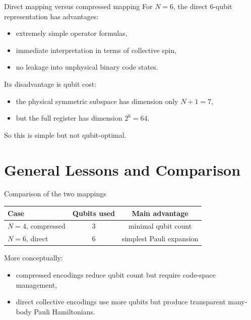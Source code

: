 \documentclass[aspectratio=169]{beamer}
\begin{document}
\begin{frame}{Direct mapping versus compressed mapping}
For \(N=6\), the direct 6-qubit representation has advantages:
\begin{itemize}
\item extremely simple operator formulas,
\item immediate interpretation in terms of collective spin,
\item no leakage into unphysical binary code states.
\end{itemize}

Its disadvantage is qubit cost:
\begin{itemize}
\item the physical symmetric subspace has dimension only \(N+1=7\),
\item but the full register has dimension \(2^6=64\).
\end{itemize}

So this is simple but not qubit-optimal.
\end{frame}

\section{General Lessons and Comparison}

\begin{frame}{Comparison of the two mappings}
\begin{center}
\begin{tabular}{lcc}
\hline
Case & Qubits used & Main advantage \\
\hline
\(N=4\), compressed & 3 & minimal qubit count \\
\(N=6\), direct & 6 & simplest Pauli expansion \\
\hline
\end{tabular}
\end{center}

More conceptually:
\begin{itemize}
\item compressed encodings reduce qubit count but require code-space management,
\item direct collective encodings use more qubits but produce transparent many-body Pauli Hamiltonians.
\end{itemize}
\end{frame}
\end{document}
